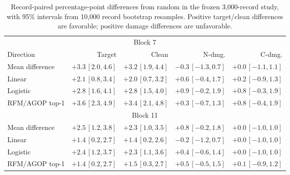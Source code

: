 \begin{table}[t]
\centering
\small
\setlength{\tabcolsep}{2.4pt}
\caption{Record-paired percentage-point differences from random in the
frozen 3,000-record study, with 95\% intervals from 10,000 record bootstrap
resamples. Positive target/clean differences are favorable; positive damage
differences are unfavorable.}
\label{tab:paired-bootstrap}
\begin{tabular*}{\textwidth}{@{\extracolsep{\fill}}lrrrr@{}}
\toprule
\multicolumn{5}{c}{Block 7} \\
\cmidrule(lr){1-5}
Direction & Target & Clean & N-dmg. & C-dmg. \\
\midrule
Mean difference & $+3.3\,[2.0,4.6]$ & $+3.2\,[1.9,4.4]$ & $-0.3\,[-1.3,0.7]$ & $+0.0\,[-1.1,1.1]$ \\
Linear & $+2.1\,[0.8,3.4]$ & $+2.0\,[0.7,3.2]$ & $+0.6\,[-0.4,1.7]$ & $+0.2\,[-0.9,1.3]$ \\
Logistic & $+2.8\,[1.6,4.1]$ & $+2.8\,[1.5,4.0]$ & $+0.9\,[-0.2,1.9]$ & $+0.8\,[-0.3,1.9]$ \\
RFM/AGOP top-1 & $+3.6\,[2.3,4.9]$ & $+3.4\,[2.1,4.8]$ & $+0.3\,[-0.7,1.3]$ & $+0.8\,[-0.4,1.9]$ \\
\midrule
\multicolumn{5}{c}{Block 11} \\
\cmidrule(lr){1-5}
Mean difference & $+2.5\,[1.2,3.8]$ & $+2.3\,[1.0,3.5]$ & $+0.8\,[-0.2,1.8]$ & $+0.0\,[-1.0,1.0]$ \\
Linear & $+1.4\,[0.2,2.7]$ & $+1.4\,[0.2,2.6]$ & $-0.2\,[-1.2,0.7]$ & $+0.0\,[-1.0,1.0]$ \\
Logistic & $+2.4\,[1.2,3.7]$ & $+2.3\,[1.1,3.6]$ & $+0.4\,[-0.6,1.4]$ & $+0.0\,[-1.0,1.0]$ \\
RFM/AGOP top-1 & $+1.4\,[0.2,2.7]$ & $+1.5\,[0.3,2.7]$ & $+0.5\,[-0.5,1.5]$ & $+0.1\,[-0.9,1.2]$ \\
\bottomrule
\end{tabular*}

\end{table}
